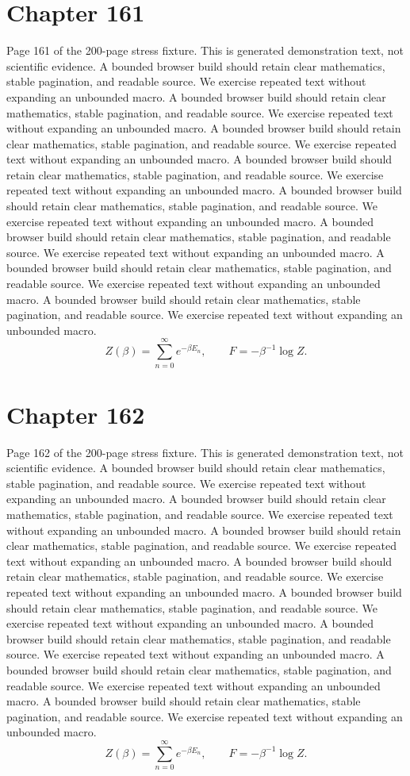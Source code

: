 \documentclass[11pt]{article}
\begin{document}
\section*{Chapter 161}
Page 161 of the 200-page stress fixture. This is generated demonstration text, not scientific evidence.
A bounded browser build should retain clear mathematics, stable pagination, and readable source. We exercise repeated text without expanding an unbounded macro.
A bounded browser build should retain clear mathematics, stable pagination, and readable source. We exercise repeated text without expanding an unbounded macro.
A bounded browser build should retain clear mathematics, stable pagination, and readable source. We exercise repeated text without expanding an unbounded macro.
A bounded browser build should retain clear mathematics, stable pagination, and readable source. We exercise repeated text without expanding an unbounded macro.
A bounded browser build should retain clear mathematics, stable pagination, and readable source. We exercise repeated text without expanding an unbounded macro.
A bounded browser build should retain clear mathematics, stable pagination, and readable source. We exercise repeated text without expanding an unbounded macro.
A bounded browser build should retain clear mathematics, stable pagination, and readable source. We exercise repeated text without expanding an unbounded macro.
A bounded browser build should retain clear mathematics, stable pagination, and readable source. We exercise repeated text without expanding an unbounded macro.
\[Z(\beta)=\sum_{n=0}^{\infty}e^{-\beta E_n},\qquad F=-\beta^{-1}\log Z.\]
\newpage
\section*{Chapter 162}
Page 162 of the 200-page stress fixture. This is generated demonstration text, not scientific evidence.
A bounded browser build should retain clear mathematics, stable pagination, and readable source. We exercise repeated text without expanding an unbounded macro.
A bounded browser build should retain clear mathematics, stable pagination, and readable source. We exercise repeated text without expanding an unbounded macro.
A bounded browser build should retain clear mathematics, stable pagination, and readable source. We exercise repeated text without expanding an unbounded macro.
A bounded browser build should retain clear mathematics, stable pagination, and readable source. We exercise repeated text without expanding an unbounded macro.
A bounded browser build should retain clear mathematics, stable pagination, and readable source. We exercise repeated text without expanding an unbounded macro.
A bounded browser build should retain clear mathematics, stable pagination, and readable source. We exercise repeated text without expanding an unbounded macro.
A bounded browser build should retain clear mathematics, stable pagination, and readable source. We exercise repeated text without expanding an unbounded macro.
A bounded browser build should retain clear mathematics, stable pagination, and readable source. We exercise repeated text without expanding an unbounded macro.
\[Z(\beta)=\sum_{n=0}^{\infty}e^{-\beta E_n},\qquad F=-\beta^{-1}\log Z.\]
\newpage
\end{document}
